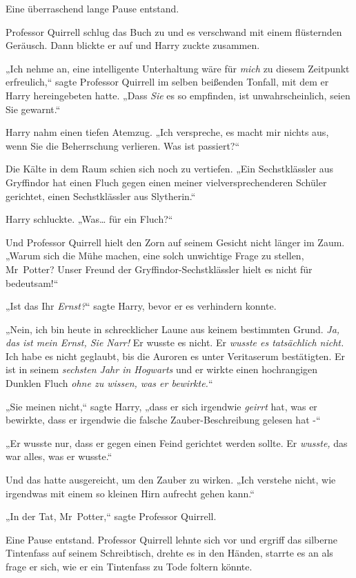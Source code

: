 {Eine überraschend lange Pause entstand.

Professor Quirrell schlug das Buch zu und es verschwand mit einem flüsternden Geräusch. Dann blickte er auf und Harry zuckte zusammen.

„Ich nehme an, eine intelligente Unterhaltung wäre für \emph{mich} zu diesem Zeitpunkt erfreulich,“ sagte Professor Quirrell im selben beißenden Tonfall, mit dem er Harry hereingebeten hatte. „Dass \emph{Sie} es so empfinden, ist unwahrscheinlich, seien Sie gewarnt.“

Harry nahm einen tiefen Atemzug. „Ich verspreche, es macht mir nichts aus, wenn Sie die Beherrschung verlieren. Was ist passiert?“

Die Kälte in dem Raum schien sich noch zu vertiefen. „Ein Sechstklässler aus Gryffindor hat einen Fluch gegen einen meiner vielversprechenderen Schüler gerichtet, einen Sechstklässler aus Slytherin.“

Harry schluckte. „Was… für ein Fluch?“

Und Professor Quirrell hielt den Zorn auf seinem Gesicht nicht länger im Zaum. „Warum sich die Mühe machen, eine solch unwichtige Frage zu stellen, Mr~Potter? Unser Freund der Gryffindor-Sechstklässler hielt es nicht für bedeutsam!“

„Ist das Ihr \emph{Ernst?}“ sagte Harry, bevor er es verhindern konnte.

„Nein, ich bin heute in schrecklicher Laune aus keinem bestimmten Grund. \emph{Ja, das ist mein Ernst, Sie Narr!} Er wusste es nicht. Er \emph{wusste es tatsächlich nicht.} Ich habe es nicht geglaubt, bis die Auroren es unter Veritaserum bestätigten. Er ist in seinem \emph{sechsten Jahr in Hogwarts} und er wirkte einen hochrangigen Dunklen Fluch \emph{ohne zu wissen, was er bewirkte.}“

„Sie meinen nicht,“ sagte Harry, „dass er sich irgendwie \emph{geirrt} hat, was er bewirkte, dass er irgendwie die falsche Zauber-Beschreibung gelesen hat -“

„Er wusste nur, dass er gegen einen Feind gerichtet werden sollte. Er \emph{wusste,} das war alles, was er wusste.“

Und das hatte ausgereicht, um den Zauber zu wirken. „Ich verstehe nicht, wie irgendwas mit einem so kleinen Hirn aufrecht gehen kann.“

„In der Tat, Mr~Potter,“ sagte Professor Quirrell.

Eine Pause entstand. Professor Quirrell lehnte sich vor und ergriff das silberne Tintenfass auf seinem Schreibtisch, drehte es in den Händen, starrte es an als frage er sich, wie er ein Tintenfass zu Tode foltern könnte.

}
